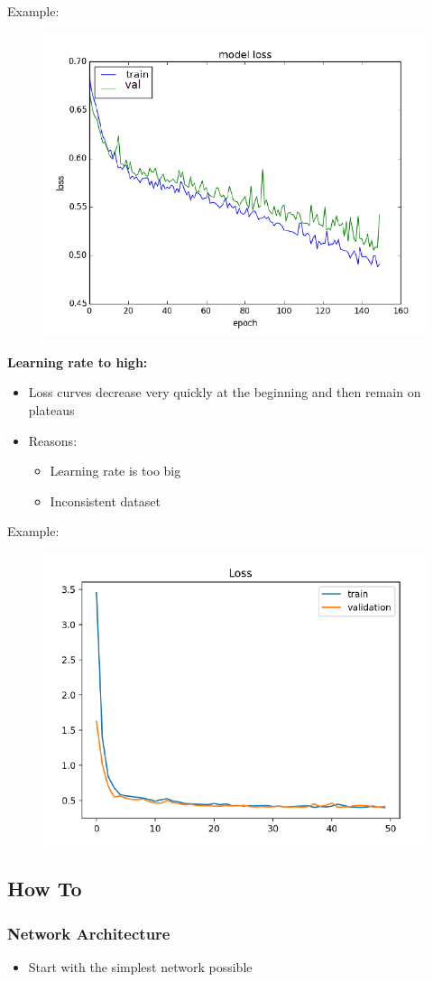 \documentclass[10pt,a4paper]{article}
\newcommand{\props}{$\circ$}
\newcommand{\iprops}{\item[\props]}
\begin{document}
Example:
\begin{figure}[H]
	\includegraphics[width=0.5\columnwidth]{figures/graph_lr_low.png}
\end{figure}

\textbf{Learning rate to high:}
\begin{itemize}
	\item Loss curves decrease very quickly at the beginning and then remain on plateaus
	\iprops Reasons:
	\begin{itemize}
		\item Learning rate is too big
		\item Inconsistent dataset
	\end{itemize}
\end{itemize}

Example:
\begin{figure}[H]
	\includegraphics[width=0.5\columnwidth]{figures/graph_lr_high.png}
\end{figure}

\subsection{How To}
\subsubsection{Network Architecture}
\begin{itemize}
	\item Start with the simplest network possible
\end{itemize}
\end{document}
